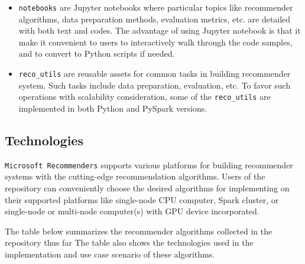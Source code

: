 \documentclass[twoside,11pt]{article}
\begin{document}
\begin{itemize}
 \item \verb|notebooks| are Jupyter notebooks where particular topics like recommender algorithms, data preparation methods, evaluation metrics, etc. are detailed with both text and codes. The advantage of using Jupyter notebook is that it make it convenient to users to interactively walk through the code samples, and to convert to Python scripts if needed.
 \item \verb|reco_utils| are reusable assets for common tasks in building recommender system. Such tasks include data preparation, evaluation, etc. To favor such operations with scalability consideration, some of the \verb|reco_utils| are implemented in both Python and PySpark versions.
\end{itemize}

\subsection{Technologies}
\verb|Microsoft Recommenders| supports various platforms for building recommender systems with the cutting-edge recommendation algorithms. Users of the repository can conveniently choose the desired algorithms for implementing on their supported platforms like single-node CPU computer, Spark cluster, or single-node or multi-node computer(s) with GPU device incorporated.

 The table below summarizes the recommender algorithms collected in the repository thus far \citep{ke2017lightgbm,wang2018dkn,lian2018xdeepfm,howard2018fastai,he2017neural,salakhutdinov2007restricted,cheng2016wide,diev2015sar,koren2009matrix} The table also shows the technologies used in the implementation and use case scenario of these algorithms. 
\end{document}
